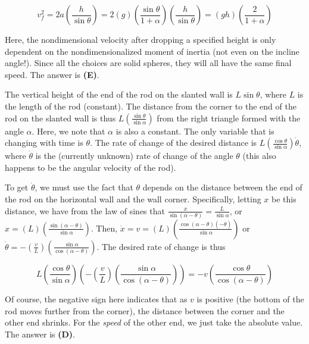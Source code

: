 \documentclass[12pt]{article}
\begin{document}
$$v_f^2 = 2 a \left( \frac{h}{\sin \theta} \right) = 2 (g) \left( \frac{\sin \theta}{1 + \alpha} \right) \left( \frac{h}{\sin \theta} \right) = (g h) \left( \frac{2}{1 + \alpha} \right)$$

Here, the nondimensional velocity after dropping a specified height is only dependent on the nondimensionalized moment of inertia (not even on the incline angle!). Since all the choices are solid spheres, they will all have the same final speed. The answer is \textbf{(E)}.


\vspace{2 \baselineskip}



The vertical height of the end of the rod on the slanted wall is $L \sin \theta$, where $L$ is the length of the rod (constant). The distance from the corner to the end of the rod on the slanted wall is thus $L \left( \frac{\sin \theta}{\sin \alpha} \right)$ from the right triangle formed with the angle $\alpha$. Here, we note that $\alpha$ is also a constant. The only variable that is changing with time is $\theta$. The rate of change of the desired distance is $L \left( \frac{\cos \theta}{\sin \alpha} \right) \dot{\theta}$, where $\dot{\theta}$ is the (currently unknown) rate of change of the angle $\theta$ (this also happens to be the angular velocity of the rod).

To get $\dot{\theta}$, we must use the fact that $\theta$ depends on the distance between the end of the rod on the horizontal wall and the wall corner. Specifically, letting $x$ be this distance, we have from the law of sines that $\frac{x}{\sin (\alpha - \theta)} = \frac{L}{\sin \alpha}$, or $x = (L) \left( \frac{\sin (\alpha - \theta)}{\sin \alpha} \right)$. Then, $\dot{x} = v = (L) \left( \frac{\cos (\alpha - \theta) (-\dot{\theta})}{\sin \alpha} \right)$ or $\dot{\theta} = -\left( \frac{v}{L} \right) \left( \frac{\sin \alpha}{\cos (\alpha - \theta)} \right)$. The desired rate of change is thus

$$L \left( \frac{\cos \theta}{\sin \alpha} \right) \left( -\left( \frac{v}{L} \right) \left( \frac{\sin \alpha}{\cos (\alpha - \theta)} \right) \right) = -v \left( \frac{\cos \theta}{\cos (\alpha - \theta)} \right)$$

Of course, the negative sign here indicates that as $v$ is positive (the bottom of the rod moves further from the corner), the distance between the corner and the other end shrinks. For the \textit{speed} of the other end, we just take the absolute value. The answer is \textbf{(D)}.
\end{document}
